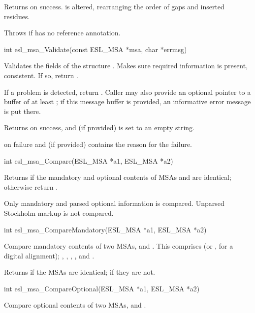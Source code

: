 \begin{sreapi}
Returns  on success.  is altered, rearranging the
order of gaps and inserted residues.

Throws  if  has no reference annotation.



\hypertarget{func:esl_msa_Validate()}
{\item[int esl\_msa\_Validate(const ESL\_MSA *msa, char *errmsg)]}

Validates the fields of the  structure
. Makes sure required information is present,
consistent. If so, return .

If a problem is detected, return . Caller may
also provide an optional  pointer to a buffer of
at least ; if this message buffer is
provided, an informative error message is put there.

Returns  on success, and  (if provided) is set
to an empty string.

 on failure and  (if provided) contains 
the reason for the failure.


\hypertarget{func:esl_msa_Compare()}
{\item[int esl\_msa\_Compare(ESL\_MSA *a1, ESL\_MSA *a2)]}

Returns  if the mandatory and optional contents
of MSAs  and  are identical; otherwise return
.

Only mandatory and parsed optional information is
compared. Unparsed Stockholm markup is not compared.


\hypertarget{func:esl_msa_CompareMandatory()}
{\item[int esl\_msa\_CompareMandatory(ESL\_MSA *a1, ESL\_MSA *a2)]}

Compare mandatory contents of two MSAs,  and .
This comprises  (or , for a digital alignment);
, , , , and .

Returns  if the MSAs are identical; 
 if they are not.


\hypertarget{func:esl_msa_CompareOptional()}
{\item[int esl\_msa\_CompareOptional(ESL\_MSA *a1, ESL\_MSA *a2)]}

Compare optional contents of two MSAs,  and .


\end{sreapi}
